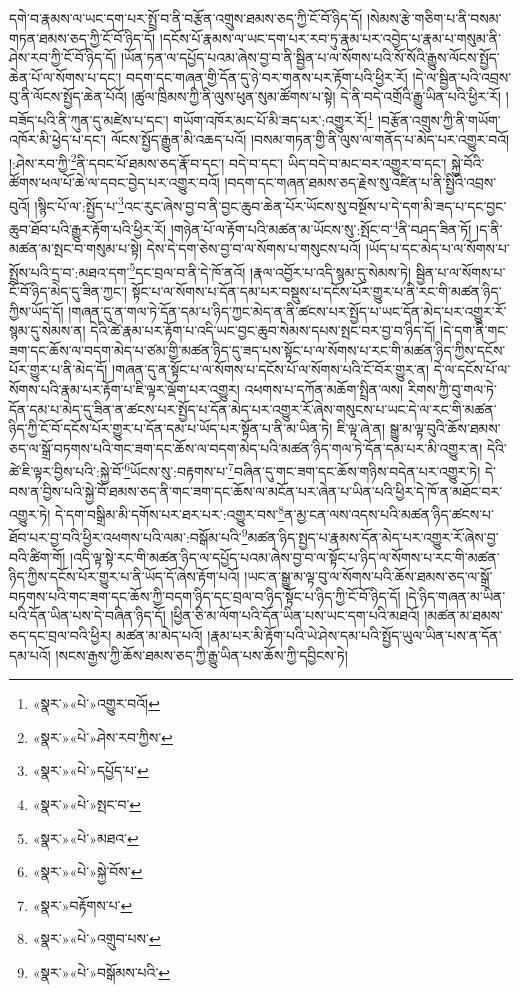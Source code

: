 དགེ་བ་རྣམས་ལ་ཡང་དག་པར་སྤྲོ་བ་ནི་བརྩོན་འགྲུས་ཐམས་ཅད་ཀྱི་ངོ་བོ་ཉིད་དོ། །སེམས་རྩེ་གཅིག་པ་ནི་བསམ་གཏན་ཐམས་ཅད་ཀྱི་ངོ་བོ་ཉིད་དོ། །དངོས་པོ་རྣམས་ལ་ཡང་དག་པར་རབ་ཏུ་རྣམ་པར་འབྱེད་པ་རྣམ་པ་གསུམ་ནི་ཤེས་རབ་ཀྱི་ངོ་བོ་ཉིད་དོ། །ཡོན་ཏན་ལ་དཔྱོད་པའམ་ཞེས་བྱ་བ་ནི་སྦྱིན་པ་ལ་སོགས་པའི་སོ་སོའི་རྒྱུས་ལོངས་སྤྱོད་ཆེན་པོ་ལ་སོགས་པ་དང་། བདག་དང་གཞན་གྱི་དོན་དུ་ཉེ་བར་གནས་པར་རྟོག་པའི་ཕྱིར་རོ། །དེ་ལ་སྦྱིན་པའི་འབྲས་བུ་ནི་ལོངས་སྤྱོད་ཆེན་པོའོ། །ཚུལ་ཁྲིམས་ཀྱི་ནི་ལུས་ཕུན་སུམ་ཚོགས་པ་སྟེ། དེ་ནི་བདེ་འགྲོའི་རྒྱུ་ཡིན་པའི་ཕྱིར་རོ། །བཟོད་པའི་ནི་ཀུན་དུ་མཛེས་པ་དང་། གཡོག་འཁོར་མང་པོ་མི་ཟད་པར་:འགྱུར་རོ།\footnote{«སྣར་»«པེ་»འགྱུར་བའོ།} །བརྩོན་འགྲུས་ཀྱི་ནི་གཡོག་འཁོར་མི་ཕྱེད་པ་དང་། ལོངས་སྤྱོད་རྒྱུན་མི་འཆད་པའོ། །བསམ་གཏན་གྱི་ནི་ལུས་ལ་གནོད་པ་མེད་པར་འགྱུར་བའོ། །:ཤེས་རབ་ཀྱི་\footnote{«སྣར་»«པེ་»ཤེས་རབ་ཀྱིས་}ནི་དབང་པོ་ཐམས་ཅད་རྣོ་བ་དང་། བདེ་བ་དང་། ཡིད་བདེ་བ་མང་བར་འགྱུར་བ་དང་། སྐྱེ་བོའི་ཚོགས་ཕལ་པོ་ཆེ་ལ་དབང་བྱེད་པར་འགྱུར་བའོ། །བདག་དང་གཞན་ཐམས་ཅད་རྗེས་སུ་འཛིན་པ་ནི་སྤྱིའི་འབྲས་བུའོ། །སྙིང་པོ་ལ་:སྤྱོད་པ་\footnote{«སྣར་»«པེ་»དཔྱོད་པ་}འང་རུང་ཞེས་བྱ་བ་ནི་བྱང་ཆུབ་ཆེན་པོར་ཡོངས་སུ་བསྔོས་པ་དེ་དག་མི་ཟད་པ་དང་བྱང་ཆུབ་ཐོབ་པའི་རྒྱུར་རྟོག་པའི་ཕྱིར་རོ། །གཉེན་པོ་ལ་རྟོག་པའི་མཚན་མ་ཡོངས་སུ་:སྤོང་བ་\footnote{«སྣར་»«པེ་»སྤང་བ་}ནི་བཤད་ཟིན་ཏོ། །ད་ནི་མཚན་མ་སྤང་བ་གསུམ་པ་སྟེ། དེས་དེ་དག་ཅེས་བྱ་བ་ལ་སོགས་པ་གསུངས་པའོ། །ཡོད་པ་དང་མེད་པ་ལ་སོགས་པ་སྤྲོས་པའི་དྲ་བ་:མཐའ་དག་\footnote{«སྣར་»«པེ་»མཐའ་}དང་བྲལ་བ་ནི་དེ་ཁོ་ནའོ། །རྣལ་འབྱོར་པ་འདི་སྙམ་དུ་སེམས་ཏེ། སྦྱིན་པ་ལ་སོགས་པ་ངོ་བོ་ཉིད་མེད་དུ་ཟིན་ཀྱང་། སྟོང་པ་ལ་སོགས་པ་དོན་དམ་པར་བསྡུས་པ་དངོས་པོར་གྱུར་པ་ནི་རང་གི་མཚན་ཉིད་ཀྱིས་ཡོད་དོ། །གཞན་དུ་ན་གལ་ཏེ་དོན་དམ་པ་ཉིད་ཀྱང་མེད་ན་ནི་ཚངས་པར་སྤྱོད་པ་ཡང་དོན་མེད་པར་འགྱུར་རོ་སྙམ་དུ་སེམས་ན། དེའི་ཚེ་རྣམ་པར་རྟོག་པ་འདི་ཡང་བྱང་ཆུབ་སེམས་དཔས་སྤང་བར་བྱ་བ་ཉིད་དོ། །དེ་དག་ནི་གང་ཟག་དང་ཆོས་ལ་བདག་མེད་པ་ཙམ་གྱི་མཚན་ཉིད་དུ་ཟད་པས་སྟོང་པ་ལ་སོགས་པ་རང་གི་མཚན་ཉིད་ཀྱིས་དངོས་པོར་གྱུར་པ་ནི་མེད་དོ། །གཞན་དུ་ན་སྟོང་པ་ལ་སོགས་པ་དངོས་པོ་ལ་སོགས་པའི་ངོ་བོར་གྱུར་ན། དེ་ལ་དངོས་པོ་ལ་སོགས་པའི་རྣམ་པར་རྟོག་པ་ཇི་ལྟར་ལྡོག་པར་འགྱུར། འཕགས་པ་དཀོན་མཆོག་སྤྲིན་ལས། རིགས་ཀྱི་བུ་གལ་ཏེ་དོན་དམ་པ་མེད་དུ་ཟིན་ན་ཚངས་པར་སྤྱོད་པ་དོན་མེད་པར་འགྱུར་རོ་ཞེས་གསུངས་པ་ཡང་དེ་ལ་རང་གི་མཚན་ཉིད་ཀྱི་ངོ་བོ་དངོས་པོར་གྱུར་པ་དོན་དམ་པ་ཡོད་པར་སྟོན་པ་ནི་མ་ཡིན་ཏེ། ཇི་ལྟ་ཞེ་ན། སྒྱུ་མ་ལྟ་བུའི་ཆོས་ཐམས་ཅད་ལ་སྒྲོ་བཏགས་པའི་གང་ཟག་དང་ཆོས་ལ་བདག་མེད་པའི་མཚན་ཉིད་གལ་ཏེ་དོན་དམ་པར་མི་འགྱུར་ན། དེའི་ཚེ་ཇི་ལྟར་བྱིས་པའི་:སྐྱེ་བོ་\footnote{«སྣར་»«པེ་»སྐྱེ་བོས་}ཡོངས་སུ་:བརྟགས་པ་\footnote{«སྣར་»བརྟོགས་པ་}བཞིན་དུ་གང་ཟག་དང་ཆོས་གཉིས་བདེན་པར་འགྱུར་ཏེ། དེ་བས་ན་བྱིས་པའི་སྐྱེ་བོ་ཐམས་ཅད་ནི་གང་ཟག་དང་ཆོས་ལ་མངོན་པར་ཞེན་པ་ཡིན་པའི་ཕྱིར་དེ་ཁོ་ན་མཐོང་བར་འགྱུར་ཏེ། དེ་དག་བསྒྲིམ་མི་དགོས་པར་ཐར་པར་:འགྱུར་བས་\footnote{«སྣར་»«པེ་»འགྲུབ་པས་}ན་མྱ་ངན་ལས་འདས་པའི་མཚན་ཉིད་ཚངས་པ་ཐོབ་པར་བྱ་བའི་ཕྱིར་འཕགས་པའི་ལམ་:བསྒོམ་པའི་\footnote{«སྣར་»«པེ་»བསྒོམས་པའི་}མཚན་ཉིད་སྤྱད་པ་རྣམས་དོན་མེད་པར་འགྱུར་རོ་ཞེས་བྱ་བའི་ཚིག་གོ། །འདི་ལྟ་སྟེ་རང་གི་མཚན་ཉིད་ལ་དཔྱོད་པའམ་ཞེས་བྱ་བ་ལ་སྟོང་པ་ཉིད་ལ་སོགས་པ་རང་གི་མཚན་ཉིད་ཀྱིས་དངོས་པོར་གྱུར་པ་ནི་ཡོད་དོ་ཞེས་རྟོག་པའོ། །ཡང་ན་སྒྱུ་མ་ལྟ་བུ་ལ་སོགས་པའི་ཆོས་ཐམས་ཅད་ལ་སྒྲོ་བཏགས་པའི་གང་ཟག་དང་ཆོས་ཀྱི་བདག་ཉིད་དང་བྲལ་བ་ཉིད་སྟོང་པ་ཉིད་ཀྱི་ངོ་བོ་ཉིད་དོ། །དེ་ཉིད་གཞན་མ་ཡིན་པའི་དོན་ཡིན་པས་དེ་བཞིན་ཉིད་དོ། །ཕྱིན་ཅི་མ་ལོག་པའི་དོན་ཡིན་པས་ཡང་དག་པའི་མཐའོ། །མཚན་མ་ཐམས་ཅད་དང་བྲལ་བའི་ཕྱིར། མཚན་མ་མེད་པའོ། །རྣམ་པར་མི་རྟོག་པའི་ཡེ་ཤེས་དམ་པའི་སྤྱོད་ཡུལ་ཡིན་པས་ན་དོན་དམ་པའོ། །སངས་རྒྱས་ཀྱི་ཆོས་ཐམས་ཅད་ཀྱི་རྒྱུ་ཡིན་པས་ཆོས་ཀྱི་དབྱིངས་ཏེ། 